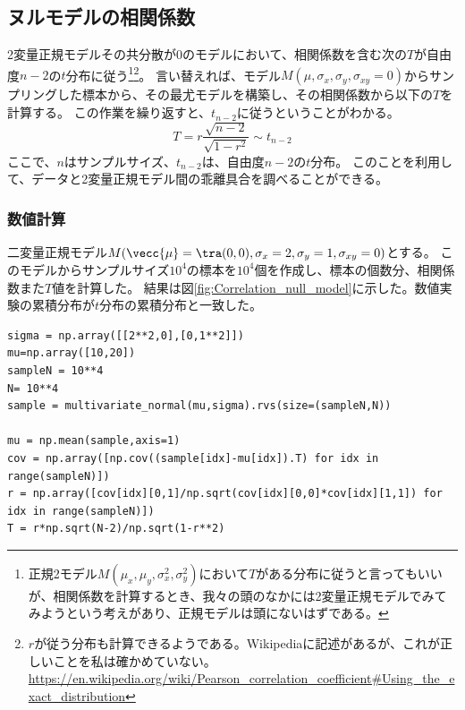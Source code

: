 \subsection{ヌルモデルの相関係数}
2変量正規モデルその共分散が$0$のモデルにおいて、相関係数を含む次の$T$が自由度$n-2$の$t$分布に従う\footnote{正規2モデル$M(\mu_x,\mu_y,\sigma_x^2,\sigma_y^2)$において$T$がある分布に従うと言ってもいいが、相関係数を計算するとき、我々の頭のなかには2変量正規モデルでみてみようという考えがあり、正規モデルは頭にないはずである。}\footnote{$r$が従う分布も計算できるようである。Wikipediaに記述があるが、これが正しいことを私は確かめていない。\url{https://en.wikipedia.org/wiki/Pearson_correlation_coefficient#Using_the_exact_distribution}}。
言い替えれば、モデル$M(\mu,\sigma_x,\sigma_y,\sigma_{xy}=0)$からサンプリングした標本から、その最尤モデルを構築し、その相関係数から以下の$T$を計算する。
この作業を繰り返すと、$t_{n-2}$に従うということがわかる。
\begin{equation*}
 T = r\frac{\sqrt{n-2}}{\sqrt{1-r^2}} \sim t_{n-2}
\end{equation*}
ここで、$n$はサンプルサイズ、$t_{n-2}$は、自由度$n-2$の$t$分布。
このことを利用して、データと2変量正規モデル間の乖離具合を調べることができる。
\subsubsection{数値計算}
二変量正規モデル$M(\vecc{\mu}=\tra (0,0),\sigma_x=2,\sigma_y=1,\sigma_{xy}=0)$とする。
このモデルからサンプルサイズ$10^4$の標本を$10^4$個を作成し、標本の個数分、相関係数また$T$値を計算した。
結果は図\ref{fig:Correlation_null_model}に示した。数値実験の累積分布が$t$分布の累積分布と一致した。

\begin{lstlisting}
sigma = np.array([[2**2,0],[0,1**2]])
mu=np.array([10,20])
sampleN = 10**4
N= 10**4
sample = multivariate_normal(mu,sigma).rvs(size=(sampleN,N))

mu = np.mean(sample,axis=1)
cov = np.array([np.cov((sample[idx]-mu[idx]).T) for idx in range(sampleN)])
r = np.array([cov[idx][0,1]/np.sqrt(cov[idx][0,0]*cov[idx][1,1]) for idx in range(sampleN)])
T = r*np.sqrt(N-2)/np.sqrt(1-r**2)
\end{lstlisting}


